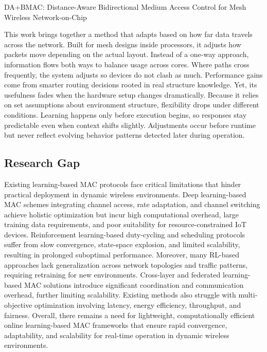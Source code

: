 \documentclass[a4paper,fleqn]{cas-dc}
\numberwithin{equation}{section}
\begin{document}
 \cite{}DA+BMAC: Distance-Aware Bidirectional Medium Access Control for Mesh Wireless Network-on-Chip

This work brings together a method that adapts based on how far data travels across the network. Built for mesh designs inside processors, it adjusts how packets move depending on the actual layout. Instead of a one-way approach, information flows both ways to balance usage across cores. Where paths cross frequently, the system adjusts so devices do not clash as much. Performance gains come from smarter routing decisions rooted in real structure knowledge. Yet, its usefulness fades when the hardware setup changes dramatically. Because it relies on set assumptions about environment structure, flexibility drops under different conditions. Learning happens only before execution begins, so responses stay predictable even when context shifts slightly. Adjustments occur before runtime but never reflect evolving behavior patterns detected later during operation.\cite{Rusli2025140914}
\subsection{Research Gap}
Existing learning-based MAC protocols face critical limitations that hinder practical deployment in dynamic wireless environments. Deep learning-based MAC schemes integrating channel access, rate adaptation, and channel switching achieve holistic optimization but incur high computational overhead, large training data requirements, and poor suitability for resource-constrained IoT devices. Reinforcement learning-based duty-cycling and scheduling protocols suffer from slow convergence, state-space explosion, and limited scalability, resulting in prolonged suboptimal performance. Moreover, many RL-based approaches lack generalization across network topologies and traffic patterns, requiring retraining for new environments. Cross-layer and federated learning-based MAC solutions introduce significant coordination and communication overhead, further limiting scalability. Existing methods also struggle with multi-objective optimization involving latency, energy efficiency, throughput, and fairness. Overall, there remains a need for lightweight, computationally efficient online learning-based MAC frameworks that ensure rapid convergence, adaptability, and scalability for real-time operation in dynamic wireless environments.
\end{document}

